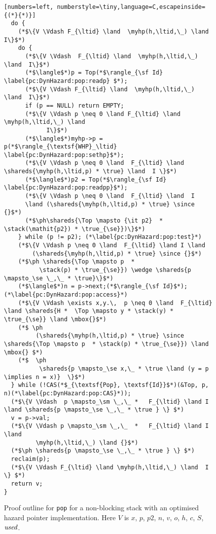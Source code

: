 \begin{figure}[p]
{\begin{lstlisting}[numbers=left, numberstyle=\tiny,language=C,escapeinside={(*}{*)}]
  do {
    (*$\{V \Vdash F_{\ltid} \land  \myhp(h,\ltid,\_) \land I\}$*)
    do {
      (*$\{V \Vdash  F_{\ltid} \land  \myhp(h,\ltid,\_) \land  I\}$*)
      (*$\langle$*)p = Top(*$\rangle_{\sf Id}  \label{pc:DynHazard:pop:readp} $*); 
      (*$\{V \Vdash F_{\ltid} \land  \myhp(h,\ltid,\_) \land  I\}$*)  
      if (p == NULL) return EMPTY;         
      (*$\{V \Vdash p \neq 0 \land F_{\ltid} \land  \myhp(h,\ltid,\_) \land 
      		I\}$*)  
      (*$\langle$*)myhp->p = p(*$\rangle_{\textsf{WHP}_\ltid} \label{pc:DynHazard:pop:sethp}$*);
      (*$\{V \Vdash p \neq 0 \land  F_{\ltid} \land   \shareds{\myhp(h,\ltid,p) * \true} \land  I \}$*) 
      (*$\langle$*)p2 = Top(*$\rangle_{\sf Id} \label{pc:DynHazard:pop:readpp}$*);
      (*$\{V \Vdash p \neq 0 \land  F_{\ltid} \land  I 
      \land (\shareds{\myhp(h,\ltid,p) * \true} \since {}$*)
      (*$\ph\shareds{\Top \mapsto {\it p2}  * \stack(\mathit{p2}) * \true_{\se}})\}$*)
    } while (p != p2); (*\label{pc:DynHazard:pop:test}*)
    (*$\{V \Vdash p \neq 0 \land  F_{\ltid} \land I \land 
        (\shareds{\myhp(h,\ltid,p) * \true} \since {}$*)
    (*$\ph \shareds{\Top \mapsto p  *
          \stack(p) * \true_{\se}}) \wedge \shareds{p \mapsto_\se \_,\_ * \true}\}$*)
    (*$\langle$*)n = p->next;(*$\rangle_{\sf Id}$*); (*\label{pc:DynHazard:pop:access}*)
    (*$\{V \Vdash \exists x,y.\,  p \neq 0 \land  F_{\ltid} \land \shareds{H *  \Top \mapsto y * \stack(y) * \true_{\se}} \land \mbox{}$*)
    (*$ \ph
         (\shareds{\myhp(h,\ltid,p) * \true} \since \shareds{\Top \mapsto p  * \stack(p) * \true_{\se}}) \land  \mbox{} $*)
    (*$  \ph
          \shareds{p \mapsto_\se x,\_ * \true \land (y = p \implies n = x)}  \}$*)   
  } while (!CAS(*$_{\textsf{Pop}, \textsf{Id}}$*)(&Top, p, n)(*\label{pc:DynHazard:pop:CAS}*));
  (*$\{V \Vdash  p \mapsto_\sm \_,\_ *   F_{\ltid} \land I \land \shareds{p \mapsto_\se \_,\_ * \true } \} $*)
  v = p->val;
  (*$\{V \Vdash p \mapsto_\sm \_,\_  *   F_{\ltid} \land I \land  
         \myhp(h,\ltid,\_) \land {}$*)
  (*$\ph \shareds{p \mapsto_\se \_,\_ * \true } \} $*)          
  reclaim(p);
  (*$\{V \Vdash F_{\ltid} \land \myhp(h,\ltid,\_) \land  I    \} $*)
  return v; 
}
\end{lstlisting}
}
\caption{\small Proof outline for {\tt pop} for a non-blocking stack with an optimised
  hazard pointer implementation.  Here
$V$ is $x$, $p$, $p2$, $n$, $v$, $o$, $h$, $c$, $S$, ${\it used}$.
\label{fig:DynHazardPop}
}
\end{figure}
 
 
 

